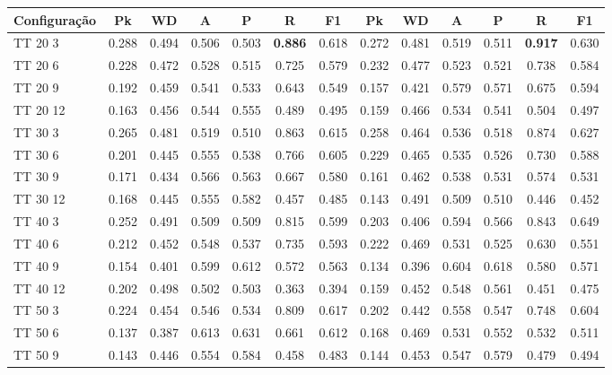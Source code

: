 \documentclass{article}
\begin{document}
 
\begin{tabular}{|l|c|c|c|c|c|c|c|c|c|c|c|c|} 
\hline 
Configuração & \textbf{Pk} & \textbf{WD} & \textbf{A } & \textbf{P } & \textbf{R } & \textbf{F1} & \textbf{Pk} & \textbf{WD} & \textbf{A } & \textbf{P } & \textbf{R } & \textbf{F1}\\ \hline
TT 20  3 & 0.288 & 0.494 & 0.506 & 0.503 & \textbf{0.886} & 0.618 & 0.272 & 0.481 & 0.519 & 0.511 & \textbf{0.917} & 0.630\\ \hline
TT 20  6 & 0.228 & 0.472 & 0.528 & 0.515 & 0.725 & 0.579 & 0.232 & 0.477 & 0.523 & 0.521 & 0.738 & 0.584\\ \hline
TT 20  9 & 0.192 & 0.459 & 0.541 & 0.533 & 0.643 & 0.549 & 0.157 & 0.421 & 0.579 & 0.571 & 0.675 & 0.594\\ \hline
TT 20 12 & 0.163 & 0.456 & 0.544 & 0.555 & 0.489 & 0.495 & 0.159 & 0.466 & 0.534 & 0.541 & 0.504 & 0.497\\ \hline
TT 30  3 & 0.265 & 0.481 & 0.519 & 0.510 & 0.863 & 0.615 & 0.258 & 0.464 & 0.536 & 0.518 & 0.874 & 0.627\\ \hline
TT 30  6 & 0.201 & 0.445 & 0.555 & 0.538 & 0.766 & 0.605 & 0.229 & 0.465 & 0.535 & 0.526 & 0.730 & 0.588\\ \hline
TT 30  9 & 0.171 & 0.434 & 0.566 & 0.563 & 0.667 & 0.580 & 0.161 & 0.462 & 0.538 & 0.531 & 0.574 & 0.531\\ \hline
TT 30 12 & 0.168 & 0.445 & 0.555 & 0.582 & 0.457 & 0.485 & 0.143 & 0.491 & 0.509 & 0.510 & 0.446 & 0.452\\ \hline
TT 40  3 & 0.252 & 0.491 & 0.509 & 0.509 & 0.815 & 0.599 & 0.203 & 0.406 & 0.594 & 0.566 & 0.843 & 0.649\\ \hline
TT 40  6 & 0.212 & 0.452 & 0.548 & 0.537 & 0.735 & 0.593 & 0.222 & 0.469 & 0.531 & 0.525 & 0.630 & 0.551\\ \hline
TT 40  9 & 0.154 & 0.401 & 0.599 & 0.612 & 0.572 & 0.563 & 0.134 & 0.396 & 0.604 & 0.618 & 0.580 & 0.571\\ \hline
TT 40 12 & 0.202 & 0.498 & 0.502 & 0.503 & 0.363 & 0.394 & 0.159 & 0.452 & 0.548 & 0.561 & 0.451 & 0.475\\ \hline
TT 50  3 & 0.224 & 0.454 & 0.546 & 0.534 & 0.809 & 0.617 & 0.202 & 0.442 & 0.558 & 0.547 & 0.748 & 0.604\\ \hline
TT 50  6 & 0.137 & 0.387 & 0.613 & 0.631 & 0.661 & 0.612 & 0.168 & 0.469 & 0.531 & 0.552 & 0.532 & 0.511\\ \hline
TT 50  9 & 0.143 & 0.446 & 0.554 & 0.584 & 0.458 & 0.483 & 0.144 & 0.453 & 0.547 & 0.579 & 0.479 & 0.494\\ \hline

\end{tabular}
\end{document}
